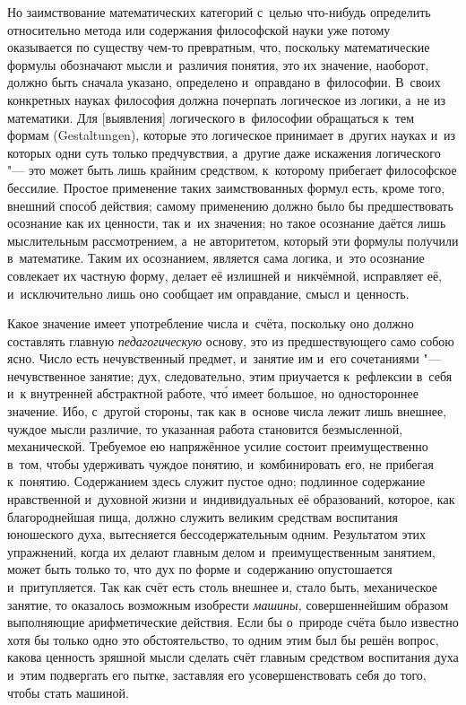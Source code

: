 Но заимствование математических категорий с~целью что-нибудь определить
относительно метода или содержания философской науки уже потому оказывается по
существу чем-то превратным, что, поскольку математические формулы обозначают
мысли и~различия понятия, это их значение, наоборот, должно быть сначала
указано, определено и~оправдано в~философии. В~своих конкретных науках
философия должна почерпать логическое из логики, а~не из математики. Для
[выявления] логического в~философии обращаться к~тем формам (Gestal\-tungen),
которые это логическое принимает в~других науках и~из которых одни суть только
предчувствия, а~другие даже искажения логического "--- это может быть лишь
крайним средством, к~которому прибегает философское бессилие. Простое применение
таких заимствованных формул есть, кроме того, внешний способ действия; самому
применению должно было бы предшествовать осознание как их ценности, так и~их
значения; но такое осознание даётся лишь мыслительным рассмотрением, а~не
авторитетом, который эти формулы получили в~математике. Таким их осознанием,
является сама логика, и~это осознание совлекает их частную форму, делает её
излишней и~никчёмной, исправляет её, и~исключительно лишь оно сообщает им
оправдание, смысл и~ценность.

Какое значение имеет употребление числа и~счёта, поскольку оно должно
составлять главную {\em педагогическую} основу, это из предшествующего само
собою ясно. Число есть нечувственный предмет, и~занятие им и~его сочетаниями
"--- нечувственное занятие; дух, следовательно, этим приучается к~рефлексии
в~себя и~к внутренней абстрактной работе, чт\'{о} имеет большое, но одностороннее
значение. Ибо, с~другой стороны, так как в~основе числа лежит лишь внешнее,
чуждое мысли различие, то указанная работа становится безмысленной,
механической. Требуемое ею напряжённое усилие состоит преимущественно в~том,
чтобы удерживать чуждое понятию, и~комбинировать его, не прибегая к~понятию.
Содержанием здесь служит пустое одно; подлинное содержание
нравственной и~духовной жизни и~индивидуальных её образований, которое, как
благороднейшая пища, должно служить великим средствам воспитания юношеского
духа, вытесняется бессодержательным одним. Результатом этих упражнений,
когда их делают главным делом и~преимущественным занятием, может быть только
то, что дух по форме и~содержанию опустошается и~притупляется. Так как счёт
есть столь внешнее и, стало быть, механическое занятие, то оказалось возможным
изобрести {\em машины,} совершеннейшим образом выполняющие арифметические
действия. Если бы о~природе счёта было известно хотя бы только одно это
обстоятельство, то одним этим был бы решён вопрос, какова ценность зряшной
мысли сделать счёт главным средством воспитания духа и~этим подвергать его
пытке, заставляя его усовершенствовать себя до того, чтобы стать машиной.

